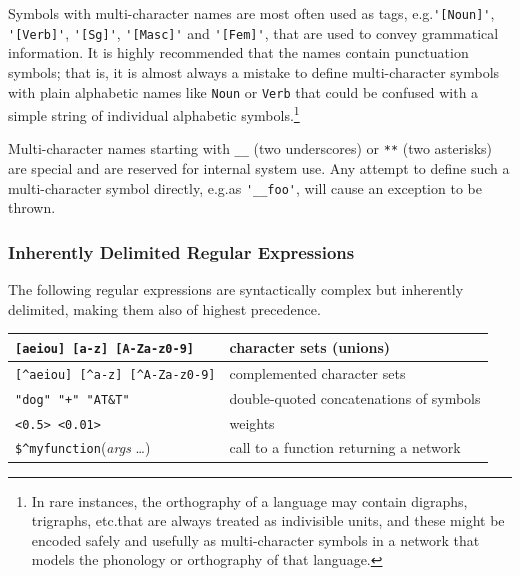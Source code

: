\documentclass[letterpaper,12pt]{article}
\begin{document}
Symbols with multi-character names are most often used as tags, e.g.\@ \verb!'[Noun]'!,
\verb!'[Verb]'!, \verb!'[Sg]'!, \verb!'[Masc]'! and \verb!'[Fem]'!, that are used to convey
grammatical information.  It is highly recommended that the names contain punctuation symbols;
that is, it is almost always a mistake to define multi-character symbols
with plain alphabetic 
names like \verb!Noun! or \verb!Verb! 
that could be confused with a simple string of individual alphabetic
symbols.\footnote{In rare instances, the orthography of a language may contain digraphs,
trigraphs, etc.\@ that are always treated as indivisible units, and these might be
encoded safely and usefully as multi-character symbols in a network that models the
phonology or orthography of that language.}

Multi-character names starting with \verb!__! (two underscores) or \verb!**! (two asterisks) are
special and are reserved for internal system use.  Any attempt to define such a
multi-character symbol directly, e.g.\@ as \verb!'__foo'!, will cause an exception to be
thrown.

\subsubsection{Inherently Delimited Regular Expressions}

The following regular expressions are syntactically complex but
inherently delimited, making them also of highest precedence.

\vspace{0.5cm}

\noindent
\begin{tabular}{|l|p{6.2cm}|}
\hline
\verb![aeiou] [a-z] [A-Za-z0-9]! & character sets (unions)\\
\hline
\verb![^aeiou] [^a-z] [^A-Za-z0-9]! & complemented character sets\\
\hline
\verb!"dog" "+" "AT&T"! & double-quoted concatenations of symbols\\
\hline
\verb!<0.5> <0.01>! &  weights\\
\hline
\verb!$^myfunction!(\textit{args} \ldots) & call to a function returning a network\\
\hline
\end{tabular}

\vspace{0.5cm}
\end{document}
